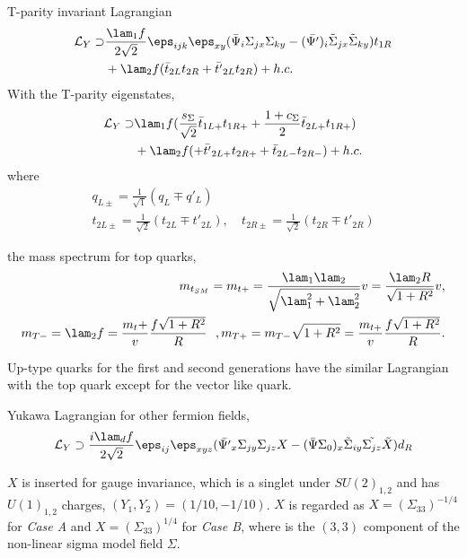 T-parity invariant Lagrangian
\begin{align}
 \mathcal{L}_Y \supset &\frac{\lam_1 f}{2 \sqrt{2}}\eps_{ijk} \eps_{xy} 
 ( \bar{\Psi}_i \Sigma_{jx} \Sigma_{ky} - (\bar{\Psi'})_i \tilde{\Sigma}_{jx} \tilde{\Sigma}_{ky} )t_{1R} \nonumber\\
 & + \lam_2 f (\bar{t}_{2L}t_{2R} + \bar{t'}_{2L} t_{2R} ) + h.c.
\end{align}
With the T-parity eigenstates, 
\begin{align}
 \mathcal{L}_Y \supset &\lam_1 f ( \frac{s_{\Sigma}}{\sqrt{2}}\bar{t}_{1L+}t_{1R+} 
  + \frac{1+c_{\Sigma}}{2}\bar{t}_{2L+}t_{1R+}) \nonumber\\
  & + \lam_2 f ( + \bar{t'}_{2L+} t_{2R+} + \bar{t}_{2L-}t_{2R-} ) + h.c.
\end{align}
where \begin{align}
       q_{L\pm}=\frac{1}{\sqrt{1}}(q_L\mp q'_{L})& \nonumber\\
       t_{2L\pm}=\frac{1}{\sqrt{2}}(t_{2L}\mp t'_{2L}),~&
       t_{2R\pm}=\frac{1}{\sqrt{2}}(t_{2R}\mp t'_{2R}) 
      \end{align}

     
 the mass spectrum for top quarks,
 \begin{align}
  m_{t_{SM}}=m_{t+}=\frac{\lam_1 \lam_2}{\sqrt{\lam_1^2 + \lam_2^2}}v=\frac{\lam_2 R}{\sqrt{1+R^2}}v, \nonumber\\
  m_{T-} = \lam_2 f=\frac{m_t+}{v}\frac{f\sqrt{1+R^2}}{R} ~~, m_{T+}=m_{T-}\sqrt{1+R^2}=\frac{m_{t+}}{v}\frac{f\sqrt{1+R^2}}{R}. 
  \label{eq:LHT:Tpm}
 \end{align}
 
 
Up-type quarks for the first and second generations have the similar Lagrangian
with the top quark except for the vector like quark. 

Yukawa Lagrangian for other fermion fields,
\begin{align}
 \mathcal{L}_{Y} \supset \frac{i\lam_d f}{2\sqrt{2}}\eps_{ij}\eps_{xyz} ( \bar{\Psi'}_x\Sigma_{jy} \Sigma_{jz} X - 
  (\bar{\Psi} \Sigma_0)_x \tilde{\Sigma}_{iy}\tilde{\Sigma_{jz}}\tilde{X}) d_R
\end{align}

$X$ is inserted for gauge invariance, which is a singlet under $SU(2)_{1,2}$ and 
has $U(1)_{1,2}$ charges, $(Y_1, Y_2)=(1/10, -1/10)$. 
$X$ is regarded as $X=(\Sigma_{33})^{-1/4}$ for \emph{Case A} and $X=(\Sigma_{33})^{1/4}$ for \emph{Case B},
where is the $(3,3)$ component of the non-linear sigma model field $\Sigma$. 


